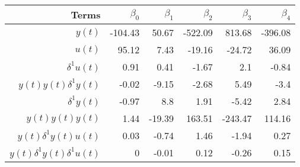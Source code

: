 \begin{tabular}{rrrrrr}
Terms & $\beta_0$ & $\beta_1$ & $\beta_2$ & $\beta_3$ & $\beta_4$ \\ 
\hline 
$y(t)$ & -104.43 & 50.67 & -522.09 & 813.68 & -396.08 \\ 
$u(t)$ & 95.12 & 7.43 & -19.16 & -24.72 & 36.09 \\ 
$\delta^1 u(t)$ & 0.91 & 0.41 & -1.67 & 2.1 & -0.84 \\ 
$y(t)y(t)\delta^1 y(t)$ & -0.02 & -9.15 & -2.68 & 5.49 & -3.4 \\ 
$\delta^1 y(t)$ & -0.97 & 8.8 & 1.91 & -5.42 & 2.84 \\ 
$y(t)y(t)y(t)$ & 1.44 & -19.39 & 163.51 & -243.47 & 114.16 \\ 
$y(t)\delta^1 y(t)u(t)$ & 0.03 & -0.74 & 1.46 & -1.94 & 0.27 \\ 
$y(t)\delta^1 y(t)\delta^1 u(t)$ & 0 & -0.01 & 0.12 & -0.26 & 0.15 \\ 
\hline 
\end{tabular}